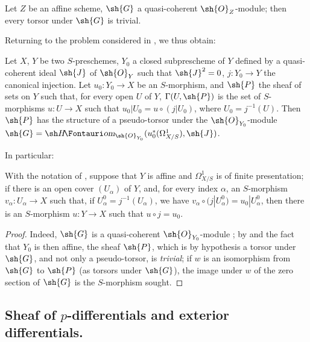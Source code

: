 \begin{proposition}[16.5.16]
\label{IV.16.5.16}
Let $Z$ be an affine scheme, $\sh{G}$ a quasi-coherent $\sh{O}_Z$-module;
then every torsor under $\sh{G}$ is trivial.
\end{proposition}

Returning to the problem considered in , we thus obtain:

\begin{proposition}[16.5.17]
\label{IV.16.5.17}
Let $X$, $Y$ be two $S$-preschemes, $Y_0$ a closed subprescheme of $Y$ defined by a quasi-coherent ideal $\sh{J}$ of $\sh{O}_Y$ such that $\sh{J}^2 = 0$, $j : Y_0 \to Y$ the canonical injection.
Let $u_0:Y_0 \to X$ be an $S$-morphism, and $\sh{P}$ the sheaf of sets on $Y$ such that, for every open $U$ of $Y$, $\Gamma(U, \sh{P})$ is the set of $S$-morphisms $u : U \to X$ such that $u_0|U_0 = u \circ (j|U_0)$, where $U_0 = j^{-1}(U)$.
Then $\sh{P}$ has the structure of a pseudo-torsor under the $\sh{O}_{Y_0}$-module $\sh{G} = \shHom_{\sh{O}_{Y_0}}(u_0^*(\Omega_{X/S}^1), \sh{J})$.
\end{proposition}

In particular:

\begin{corollary}[16.5.18]
\label{IV.16.5.18}
With the notation of , suppose that $Y$ is affine and $\Omega_{X/S}^1$ is of finite presentation;
if there is an open cover $(U_\alpha)$ of $Y$, and, for every index $\alpha$, an $S$-morphism $v_\alpha : U_\alpha \to X$ such that, if $U_\alpha^0 = j^{-1}(U_\alpha)$, we have $v_\alpha \circ (j|U_\alpha^0) = u_0|U_\alpha^0$, then there is an $S$-morphism $u : Y \to X$ such that $u \circ j = u_0$.
\end{corollary}

\begin{proof}
Indeed, $\sh{G}$ is a quasi-coherent $\sh{O}_{Y_0}$-module ;
by  and the fact that $Y_0$ is then affine, the sheaf $\sh{P}$, which is by hypothesis a torsor under $\sh{G}$, and not only a pseudo-torsor, is \emph{trivial};
if $w$ is an isomorphism from $\sh{G}$ to $\sh{P}$ (as torsors under $\sh{G}$), the image under $w$ of the zero section of $\sh{G}$ is the $S$-morphism sought.
\end{proof}

\subsection{Sheaf of $p$-differentials and exterior differentials.}
\label{IV.16.6}

